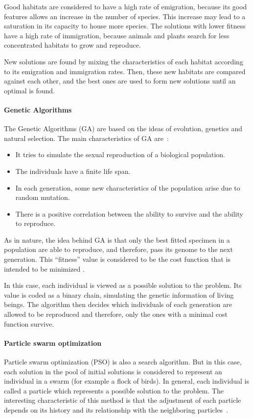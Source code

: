 Good habitats are considered to have a high rate of emigration, because its good features allows an increase in the number of species. This increase may lead to a saturation in its capacity to house more species. The solutions with lower fitness have a high rate of immigration, because animals and plants search for less concentrated habitats to grow and reproduce.

New solutions are found by mixing the characteristics of each habitat according to its emigration and immigration rates. Then, these new habitats are compared against each other, and the best ones are used to form new solutions until an optimal is found.

\paragraph{Genetic Algorithms}
The Genetic Algorithms (GA) are based on the ideas of evolution, genetics and natural selection. The main characteristics of GA are~\citep{Simon2013}:
%
\begin{itemize}
	\item It tries to simulate the sexual reproduction of a biological population.
	\item The individuals have a finite life span.
	\item In each generation, some new characteristics of the population arise due to random mutation.
	\item There is a positive correlation between the ability to survive and the ability to reproduce.
\end{itemize}

As in nature, the idea behind GA is that only the best fitted specimen in a population are able to reproduce, and therefore, pass its genome to the next generation. This ``fitness'' value is considered to be the cost function that is intended to be minimized \citep{Mitchell1995}.

In this case, each individual is viewed as a possible solution to the problem. Its value is coded as a binary chain, simulating the genetic information of living beings. The algorithm then decides which individuals of each generation are allowed to be reproduced and therefore, only the ones with a minimal cost function survive.
%
\paragraph{Particle swarm optimization}
Particle swarm optimization (PSO) is also a search algorithm. But in this case, each solution in the pool of initial solutions is considered to represent an individual in a swarm (for example a flock of birds). In general, each individual is called a particle which represents a possible solution to the problem. The interesting characteristic of this method is that the adjustment of each particle depends on its history and its relationship with the neighboring particles~\citep{Shi2004}.

